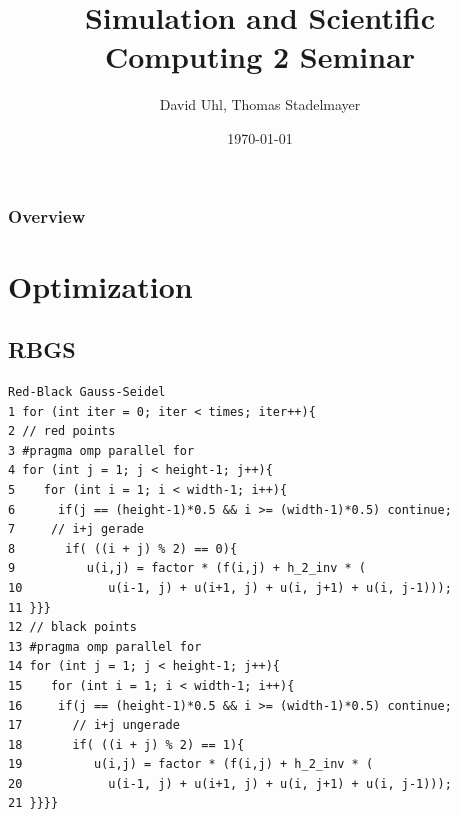\documentclass{beamer}
\title[Short title]{Simulation and Scientific Computing 2 \newline Seminar} %
\author{David Uhl, Thomas Stadelmayer} %
\institute[FAU] %
{
Friedrich Alexander Universit\"at Erlangen N\"urnberg \\ %
\medskip
}
\date{\today} %
\begin{document}
\begin{frame}
\titlepage %
\end{frame}

\begin{frame}
\frametitle{Overview} %
\tableofcontents %
\end{frame}


\section{Optimization} %

\subsection{RBGS} %


 \begin{lstlisting}
Red-Black Gauss-Seidel
1 for (int iter = 0; iter < times; iter++){
2 // red points
3 #pragma omp parallel for
4 for (int j = 1; j < height-1; j++){
5    for (int i = 1; i < width-1; i++){
6      if(j == (height-1)*0.5 && i >= (width-1)*0.5) continue;
7 	  // i+j gerade
8       if( ((i + j) % 2) == 0){
9          u(i,j) = factor * (f(i,j) + h_2_inv * ( 
10            u(i-1, j) + u(i+1, j) + u(i, j+1) + u(i, j-1)));
11 }}}
12 // black points
13 #pragma omp parallel for
14 for (int j = 1; j < height-1; j++){
15    for (int i = 1; i < width-1; i++){
16     if(j == (height-1)*0.5 && i >= (width-1)*0.5) continue;
17       // i+j ungerade
18       if( ((i + j) % 2) == 1){
19          u(i,j) = factor * (f(i,j) + h_2_inv * ( 
20            u(i-1, j) + u(i+1, j) + u(i, j+1) + u(i, j-1)));
21 }}}}


\end{lstlisting}
\end{document}
